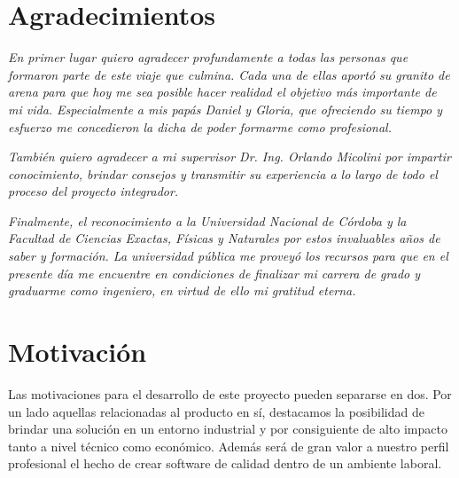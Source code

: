 \documentclass[a4paper,12pt]{article}
\begin{document}
\newpage
\thispagestyle{empty}
\section*{Agradecimientos}
\vspace*{\fill}

\begin{flushright}
	\textit{En primer lugar quiero agradecer profundamente a todas las personas que formaron parte de este viaje que culmina. Cada una de ellas aportó su granito de arena para que hoy me sea posible hacer realidad el objetivo más importante de mi vida. Especialmente a mis papás Daniel y Gloria, que ofreciendo su tiempo y esfuerzo me concedieron la dicha de poder formarme como profesional.}
\end{flushright}

\begin{flushright}
	\textit{También quiero agradecer a mi supervisor Dr. Ing. Orlando Micolini por impartir conocimiento, brindar consejos y transmitir su experiencia a lo largo de todo el proceso del proyecto integrador.}
\end{flushright}

\begin{flushright}
	\textit{Finalmente, el reconocimiento a la Universidad Nacional de Córdoba y la Facultad de Ciencias Exactas, Físicas y Naturales por estos invaluables años de saber y formación. La universidad pública me proveyó los recursos para que en el presente día me encuentre en condiciones de finalizar mi carrera de grado y graduarme como ingeniero, en virtud de ello mi gratitud eterna.}
\end{flushright}

\vspace*{\fill}

\clearpage

\tableofcontents

\clearpage
\section{Motivación}
Las motivaciones para el desarrollo de este proyecto pueden separarse en dos. Por un lado aquellas relacionadas al producto en sí, destacamos la posibilidad de brindar una solución en un entorno industrial y por consiguiente de alto impacto tanto a nivel técnico como económico. Además será de gran valor a nuestro perfil profesional el hecho de crear software de calidad dentro de un ambiente laboral.
\end{document}
